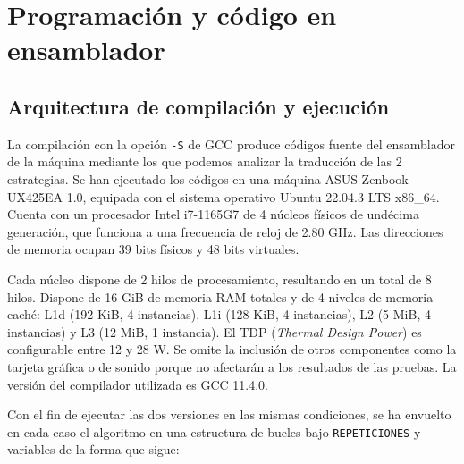 \documentclass[11pt,a4paper,twoside]{article}
\theoremstyle{definition}
\begin{document}
	
	\section{Programación y código en ensamblador}
	
	\subsection{Arquitectura de compilación y ejecución}
	
	La compilación con la opción \texttt{-S} de GCC produce códigos fuente del ensamblador de la máquina mediante los que podemos analizar la traducción de las 2 estrategias. Se han ejecutado los códigos en una máquina ASUS Zenbook UX425EA 1.0, equipada con el sistema operativo Ubuntu 22.04.3 LTS x86\_64. Cuenta con un procesador Intel i7-1165G7 de 4 núcleos físicos de undécima generación, que funciona a una frecuencia de reloj de 2.80 GHz. Las direcciones de memoria ocupan 39 bits físicos y 48 bits virtuales.
	
	Cada núcleo dispone de 2 hilos de procesamiento, resultando en un total de 8 hilos. Dispone de 16 GiB de memoria RAM totales y de 4 niveles de memoria caché: L1d (192 KiB, 4 instancias), L1i (128 KiB, 4 instancias), L2 (5 MiB, 4 instancias) y L3 (12 MiB, 1 instancia). El TDP (\textit{Thermal Design Power}) es configurable entre 12 y 28 W. Se omite la inclusión de otros componentes como la tarjeta gráfica o de sonido porque no afectarán a los resultados de las pruebas. La versión del compilador utilizada es GCC 11.4.0.

	Con el fin de ejecutar las dos versiones en las mismas condiciones, se ha envuelto en cada caso el algoritmo en una estructura de bucles bajo \texttt{REPETICIONES} y variables de la forma que sigue:
	
\end{document}
